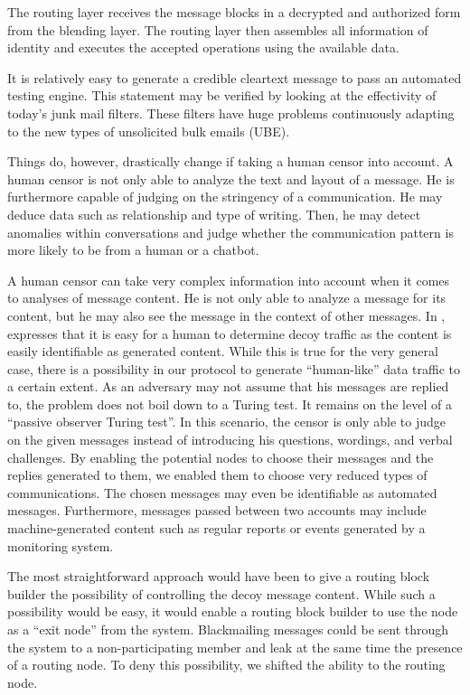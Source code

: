 \documentclass[acmsmall, screen]{acmart}
\begin{document}
The routing layer receives the message blocks in a decrypted and authorized form from the blending layer. The routing layer then assembles all information of identity and executes the accepted operations using the available data. 

It is relatively easy to generate a credible cleartext message to pass an automated testing engine. This statement may be verified by looking at the effectivity of today's junk mail filters. These filters have huge problems continuously adapting to the new types of unsolicited bulk emails (UBE).

Things do, however, drastically change if taking a human censor into account. A human censor is not only able to analyze the text and layout of a message. He is furthermore capable of judging on the stringency of a communication. He may deduce data such as relationship and type of writing. Then, he may detect anomalies within conversations and judge whether the communication pattern is more likely to be from a human or a chatbot.

A human censor can take very complex information into account when it comes to analyses of message content. He is not only able to analyze a message for its content, but he may also see the message in the context of other messages. In \cite{oakland2013-parrot}, \citeauthor{oakland2013-parrot}  expresses that it is easy for a human to determine decoy traffic as the content is easily identifiable as generated content. While this is true for the very general case, there is a possibility in our protocol to generate ``human-like'' data traffic to a certain extent. As an adversary may not assume that his messages are replied to, the problem does not boil down to a Turing test. It remains on the level of a ``passive observer Turing test''. In this scenario, the censor is only able to judge on the given messages instead of introducing his questions, wordings, and verbal challenges. By enabling the potential nodes to choose their messages and the replies generated to them, we enabled them to choose very reduced types of communications. The chosen messages may even be identifiable as automated messages. Furthermore, messages passed between two accounts may include machine-generated content such as regular reports or events generated by a monitoring system.

The most straightforward approach would have been to give a routing block builder the possibility of controlling the decoy message content. While such a possibility would be easy, it would enable a routing block builder to use the node as a ``exit node'' from the system. Blackmailing messages could be sent through the system to a non-participating member and leak at the same time the presence of a routing node. To deny this possibility, we shifted the ability to the routing node.
\end{document}

